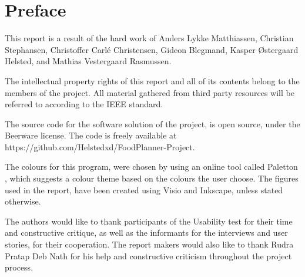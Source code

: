 \chapter*{Preface} \label{PrefaceLabel}

This report is a result of the hard work of Anders Lykke Matthiassen, Christian Stephansen, Christoffer Carlé Christensen, Gideon Blegmand, Kasper Østergaard Helsted, and Mathias Vestergaard Rasmussen.

The intellectual property rights of this report and all of its contents belong to the members of the project. All material gathered from third party resources will be referred to according to the IEEE standard.

The source code for the software solution of the project, is open source, under the Beerware license. The code is freely available at https://github.com/Helstedxd/FoodPlanner-Project.

The colours for this program, were chosen by using an online tool called Paletton \cite{paletton}, which suggests a colour theme based on the colours the user choose. The figures used in the report, have been created using Visio and Inkscape, unless stated otherwise.

The authors would like to thank participants of the Usability test for their time and constructive critique, as well as the informants for the interviews and user stories, for their cooperation. The report makers would also like to thank Rudra Pratap Deb Nath for his help and constructive criticism throughout the project process.
